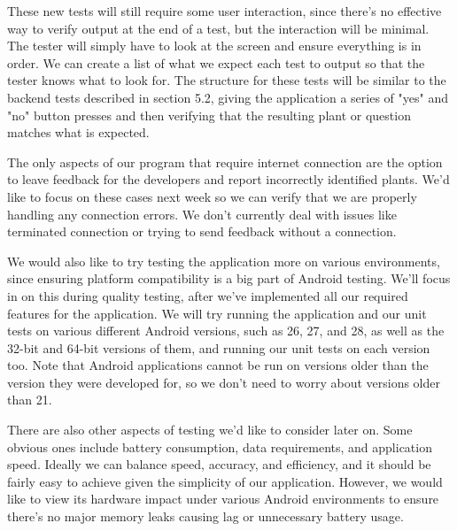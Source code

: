 \documentclass[a4paper]{article}
\begin{document}
These new tests will still require some user interaction, since there's no effective way to verify output at the end of a test, but the interaction will be minimal. The tester will simply have to look at the screen and ensure everything is in order. We can create a list of what we expect each test to output so that the tester knows what to look for. The structure for these tests will be similar to the backend tests described in section 5.2, giving the application a series of "yes" and "no" button presses and then verifying that the resulting plant or question matches what is expected.

The only aspects of our program that require internet connection are the option to leave feedback for the developers and report incorrectly identified plants. We'd like to focus on these cases next week so we can verify that we are properly handling any connection errors. We don't currently deal with issues like terminated connection or trying to send feedback without a connection. 

We would also like to try testing the application more on various environments, since ensuring platform compatibility is a big part of Android testing. We'll focus in on this during quality testing, after we've implemented all our required features for the application. We will try running the application and our unit tests on various different Android versions, such as 26, 27, and 28, as well as the 32-bit and 64-bit versions of them, and running our unit tests on each version too. Note that Android applications cannot be run on versions older than the version they were developed for, so we don't need to worry about versions older than 21. 

There are also other aspects of testing we'd like to consider later on. Some obvious ones include battery consumption, data requirements, and application speed. Ideally we can balance speed, accuracy, and efficiency, and it should be fairly easy to achieve given the simplicity of our application. However, we would like to view its hardware impact under various Android environments to ensure there's no major memory leaks causing lag or unnecessary battery usage. 
\pagebreak
\end{document}
